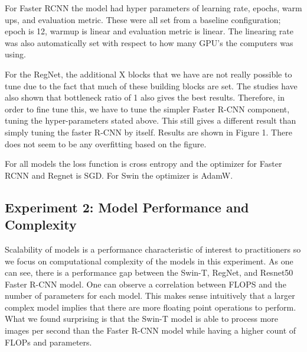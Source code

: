 \documentclass[10pt,twocolumn,letterpaper]{article}
\begin{document}
For Faster RCNN the model had hyper parameters of learning rate, epochs, warm ups, and evaluation metric. These were all set from a baseline configuration; epoch is 12, warmup is linear and evaluation metric is linear. The linearing rate was also automatically set with respect to how many GPU's the computers was using. 

For the RegNet, the additional X blocks that we have are not really possible to tune due to the fact that much of these building blocks are set. The studies have also shown that bottleneck ratio of 1 also gives the best results. Therefore, in order to fine tune this, we have to tune the simpler Faster R-CNN component, tuning the hyper-parameters stated above. This still gives a different result than simply tuning the faster R-CNN by itself. Results are shown in Figure 1. There does not seem to be any overfitting based on the figure.  

For all models the loss function is cross entropy and the optimizer for Faster RCNN and Regnet is SGD. For Swin the optimizer is AdamW. 

\subsection{Experiment 2: Model Performance and Complexity}

\begin{table}[hbt!]
\begin{center}
\end{center}
\caption{Model performance and complexity with 720p images}
\end{table}

Scalability of models is a performance characteristic of interest to practitioners so we focus on computational complexity of the models in this experiment. As one can see, there is a performance gap between the Swin-T, RegNet, and Resnet50 Faster R-CNN model. One can observe a correlation between FLOPS and the number of parameters for each model. This makes sense intuitively that a larger complex model implies that there are more floating point operations to perform. What we found surprising is that the Swin-T model is able to process more images per second than the Faster R-CNN model while having a higher count of FLOPs and parameters.
\end{document}
